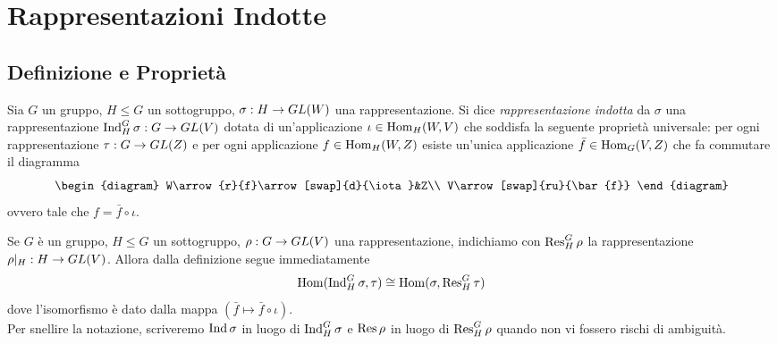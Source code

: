 \chapter{Rappresentazioni Indotte}

\section{Definizione e Proprietà}

\begin{definition}
Sia $G$ un gruppo, $H\le G$ un sottogruppo, $\sigma:H\to GL(W)$ una rappresentazione. Si dice \emph{rappresentazione indotta} da $\sigma$ una rappresentazione $\operatorname{Ind}_H^G\sigma:G\to GL(V)$ dotata di un'applicazione $\iota\in\operatorname{Hom}_H(W,V)$ che soddisfa la seguente proprietà universale: per ogni rappresentazione $\tau:G\to GL(Z)$ e per ogni applicazione $f\in\operatorname{Hom}_H(W,Z)$ esiste un'unica applicazione $\bar{f}\in\operatorname{Hom}_G(V,Z)$ che fa commutare il diagramma
$$
\begin{diagram}
W\arrow{r}{f}\arrow[swap]{d}{\iota}&Z\\
V\arrow[swap]{ru}{\bar{f}}
\end{diagram}
$$
ovvero tale che $f=\bar{f}\circ\iota$.
\end{definition}

Se $G$ è un gruppo, $H\le G$ un sottogruppo, $\rho:G\to GL(V)$ una rappresentazione, indichiamo con $\operatorname{Res}_H^G\rho$ la rappresentazione $\rho|_H:H\to GL(V)$. Allora dalla definizione segue immediatamente
$$
\operatorname{Hom}(\operatorname{Ind}_H^G\sigma,\tau)\cong\operatorname{Hom}(\sigma,\operatorname{Res}_H^G\tau)
$$
dove l'isomorfismo è dato dalla mappa $(\bar{f}\mapsto\bar{f}\circ\iota)$.\\
Per snellire la notazione, scriveremo $\operatorname{Ind}\sigma$ in luogo di $\operatorname{Ind}_H^G\sigma$ e $\operatorname{Res}\rho$ in luogo di $\operatorname{Res}_H^G\rho$ quando non vi fossero rischi di ambiguità.

